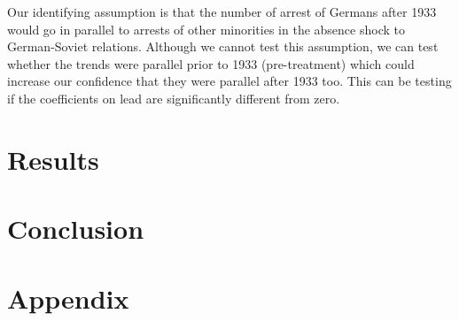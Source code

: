 \documentclass[12pt]{article}
\begin{document}
Our identifying assumption is that the number of arrest of Germans after 1933 would go in parallel to arrests of other minorities in the absence shock to German-Soviet relations. Although we cannot test this assumption, we can test whether the trends were parallel prior to 1933 (pre-treatment) which could increase our confidence that they were parallel after 1933 too. This can be testing if the coefficients on lead are significantly different from zero.  
\section{Results}


\section{Conclusion}





\newpage
\section*{Appendix}
\end{document}
